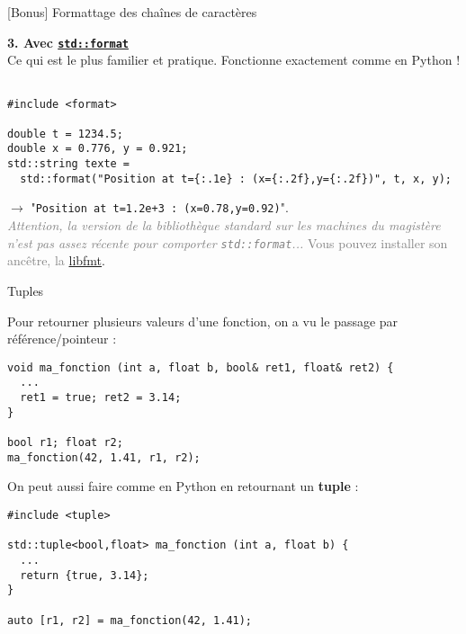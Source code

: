\documentclass[c]{beamer}
\begin{document}
\begin{frame}[fragile]{[Bonus] Formattage des chaînes de caractères}

\large{\textbf{3. Avec \href{https://en.cppreference.com/w/cpp/utility/format}{\texttt{std::format}}}}\\
  
Ce qui est le plus familier et pratique. Fonctionne exactement comme en Python !

\begin{verbatim}

#include <format>

double t = 1234.5;
double x = 0.776, y = 0.921;
std::string texte =
  std::format("Position at t={:.1e} : (x={:.2f},y={:.2f})", t, x, y);

\end{verbatim}

$\rightarrow$ "\texttt{Position at t=1.2e+3 : (x=0.78,y=0.92)}".\\

{\small\textcolor{gray}{\textit{Attention, la version de la bibliothèque standard sur les machines du magistère n'est pas assez récente pour comporter \texttt{std::format}...} Vous pouvez installer son ancêtre, la \href{https://fmt.dev/latest/index.html}{libfmt}}.}

\end{frame}


\begin{frame}[fragile]{Tuples}

Pour retourner plusieurs valeurs d'une fonction, on a vu le passage par référence/pointeur :
\begin{verbatim}
void ma_fonction (int a, float b, bool& ret1, float& ret2) {
  ...
  ret1 = true; ret2 = 3.14;
}

bool r1; float r2;
ma_fonction(42, 1.41, r1, r2);
\end{verbatim}
\vspace{0.5em}
\pause

On peut aussi faire comme en Python en retournant un \textbf{tuple} :
\begin{verbatim}
#include <tuple>

std::tuple<bool,float> ma_fonction (int a, float b) {
  ...
  return {true, 3.14};
}

auto [r1, r2] = ma_fonction(42, 1.41);
\end{verbatim}

\end{frame}
\end{document}

